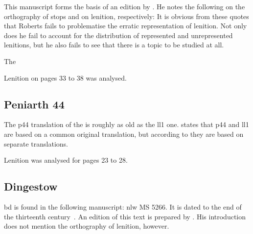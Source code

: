This manuscript forms the basis of an edition
by \textcite{roberts_brut_1971}.  He notes the following on the
orthography of stops and on lenition, respectively:
It is obvious from these quotes that Roberts fails to problematise the
erratic representation of lenition.  Not only does he fail to account
for the distribution of represented and unrepresented lenitions, but
he also fails to see that there is a topic to be studied at all.

The 

Lenition on pages 33 to 38 was analysed.

\subsection{Peniarth 44}
The \gls{p44} translation of the  is roughly as old as the \gls{ll1} one.
\Textcite{lewis_brut_1942} states that \gls{p44} and \gls{ll1} are based on a common original translation,
but according to \textcite[xliii--xliv]{roberts_astudiaeth_1969}  they are based on separate translations.

Lenition was analysed for pages 23 to 28.
\subsection{Dingestow}
\label{sec:dingestow}
\Gls{bd} is found in the following manuscript: \gls{nlw} MS 5266.  It
is dated to the end of the thirteenth century~\autocite[xliii]{roberts_astudiaeth_1969}.
An edition of this text is prepared by \textcite{lewis_brut_1942}.  His
introduction does not mention the orthography of lenition, however.

